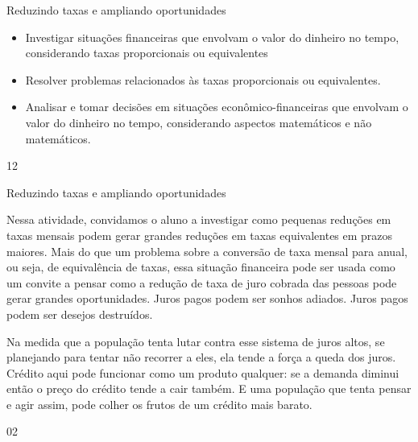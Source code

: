 \marginpar{\vspace{-2.5em}}
\begin{objectives}{Reduzindo taxas e ampliando oportunidades}
{
\begin{itemize}
\item Investigar situações financeiras que envolvam o valor do dinheiro no tempo, considerando taxas proporcionais ou equivalentes
\item Resolver problemas relacionados às taxas proporcionais ou equivalentes.
\item Analisar e tomar decisões em situações econômico-financeiras que envolvam o valor do dinheiro no tempo, considerando aspectos matemáticos e não matemáticos.
\end{itemize}
}{1}{2}
\end{objectives}
\begin{sugestions}{Reduzindo taxas e ampliando oportunidades}
{
Nessa atividade, convidamos o aluno a investigar como pequenas reduções em taxas mensais podem gerar grandes reduções em taxas equivalentes em prazos maiores. Mais do que um problema sobre a conversão de taxa mensal para anual, ou seja, de equivalência de taxas, essa situação financeira pode ser usada como um convite a pensar como a redução de taxa de juro cobrada das pessoas pode gerar grandes oportunidades. Juros pagos podem ser sonhos adiados. Juros pagos podem ser desejos destruídos.

Na medida que a população tenta lutar contra esse sistema de juros altos, se planejando para tentar não recorrer a eles, ela tende a força a queda dos juros. Crédito aqui pode funcionar como um produto qualquer: se a demanda diminui então o preço do crédito tende a cair também. E uma população que tenta pensar e agir assim, pode colher os frutos de um crédito mais barato.
\columnbreak
}{0}{2}
\end{sugestions}
